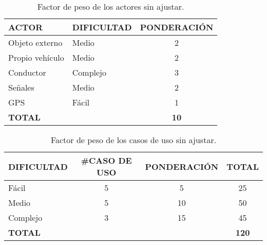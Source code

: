 \begin{table}[!hb]
\begin{center}
\begin{tabular}{l l c}
\textbf{ACTOR} & \textbf{DIFICULTAD} & \textbf{PONDERACIÓN}\\ \hline \hline
Objeto externo & Medio & 2  \\
Propio vehículo & Medio & 2\\
Conductor & Complejo & 3\\
Señales & Medio & 2\\
GPS & Fácil & 1\\ \hline
\textbf{TOTAL} &  & \textbf{10}\\ \hline \hline
\end{tabular}
\caption{Factor de peso de los actores sin ajustar.}
\label{tab:uaw}
\end{center}
\end{table}


\begin{table}[!hb]
\begin{center}
\begin{tabular}{l c c c}
\textbf{DIFICULTAD} & \textbf{\#CASO DE USO} & \textbf{PONDERACIÓN} & \textbf{TOTAL}\\ \hline \hline
Fácil & 5 & 5 & 25  \\
Medio & 5 & 10 & 50\\
Complejo & 3 & 15 & 45\\ \hline
\textbf{TOTAL} &  & & \textbf{120}\\ \hline \hline
\end{tabular}
\caption{Factor de peso de los casos de uso sin ajustar.}
\label{tab:ucw}
\end{center}
\end{table}


